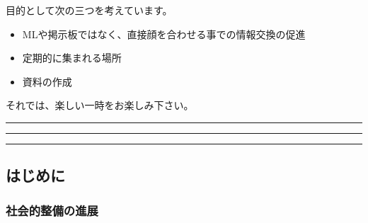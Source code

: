 \documentclass[mingoth,a4paper]{jsarticle}
\begin{document}
 目的として次の三つを考えています。
 \begin{itemize}
  \item MLや掲示板ではなく、直接顔を合わせる事での情報交換の促進
  \item 定期的に集まれる場所
  \item 資料の作成
 \end{itemize}

 それでは、楽しい一時をお楽しみ下さい。

\newpage

\begin{minipage}[b]{0.2\hsize}
 {}
\end{minipage}
\begin{minipage}[b]{0.8\hsize}
\hrule
\vspace{2mm}
\hrule
\setcounter{tocdepth}{1}
\tableofcontents
\vspace{2mm}
\hrule
\end{minipage}


\subsection{はじめに}
\subsubsection{社会的整備の進展}
\end{document}
